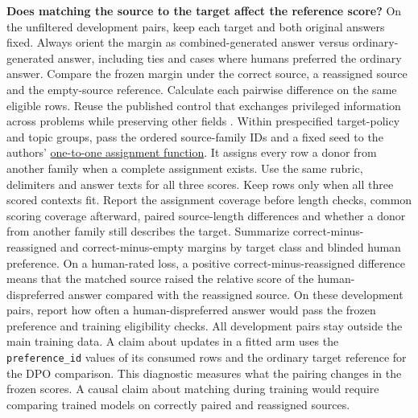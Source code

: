 \documentclass[11pt]{article}
\begin{document}
\textbf{Does matching the source to the target affect the reference score?} On the unfiltered development pairs, keep each target and both original answers fixed. Always orient the margin as combined-generated answer versus ordinary-generated answer, including ties and cases where humans preferred the ordinary answer. Compare the frozen margin under the correct source, a reassigned source and the empty-source reference. Calculate each pairwise difference on the same eligible rows. Reuse the published control that exchanges privileged information across problems while preserving other fields \cite{shrestha2026privileged,ichihara2026privileged}. Within prespecified target-policy and topic groups, pass the ordered source-family IDs and a fixed seed to the authors' \href{https://github.com/MBZUAI-reasoninglab/OP2SD/blob/dee6efb2169dfff9b068ea8cda6268182af22a2b/src/op2sd/donors.py#L16-L58}{one-to-one assignment function}. It assigns every row a donor from another family when a complete assignment exists. Use the same rubric, delimiters and answer texts for all three scores. Keep rows only when all three scored contexts fit. Report the assignment coverage before length checks, common scoring coverage afterward, paired source-length differences and whether a donor from another family still describes the target. Summarize correct-minus-reassigned and correct-minus-empty margins by target class and blinded human preference. On a human-rated loss, a positive correct-minus-reassigned difference means that the matched source raised the relative score of the human-dispreferred answer compared with the reassigned source. On these development pairs, report how often a human-dispreferred answer would pass the frozen preference and training eligibility checks. All development pairs stay outside the main training data. A claim about updates in a fitted arm uses the \texttt{preference\_id} values of its consumed rows and the ordinary target reference for the DPO comparison. This diagnostic measures what the pairing changes in the frozen scores. A causal claim about matching during training would require comparing trained models on correctly paired and reassigned sources.
\end{document}
